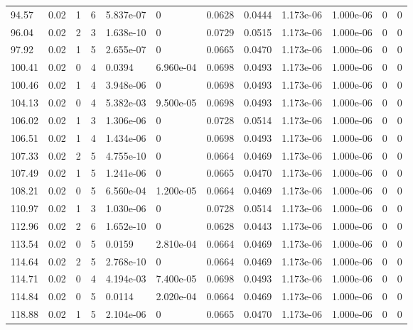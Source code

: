 \documentclass[preview]{standalone}
\begin{document}
{{{\begin{tabular}{L{1.2cm}C{1.2cm} C{0.3cm}C{0.5cm} C{1.4cm}C{1.4cm} C{1.4cm}C{1.4cm} C{1.6cm}C{1.6cm} C{1.6cm}C{1.6cm}}
  94.57  &  0.02  & 1     &  6 &  5.837e-07  & 0  &  0.0628&   0.0444& 1.173e-06 & 1.000e-06   &  0 & 0  \\ 
  96.04  &  0.02  & 2     &  3 &  1.638e-10  & 0  &  0.0729&   0.0515& 1.173e-06 & 1.000e-06   &  0 & 0  \\ 
  97.92  &  0.02  & 1     &  5 &  2.655e-07  & 0  &  0.0665&   0.0470& 1.173e-06 & 1.000e-06   &  0 & 0  \\ 
  100.41  &  0.02  & 0     &  4 &  0.0394  & 6.960e-04  &  0.0698&   0.0493& 1.173e-06 & 1.000e-06   &  0 & 0  \\ 
  100.46  &  0.02  & 1     &  4 &  3.948e-06  & 0  &  0.0698&   0.0493& 1.173e-06 & 1.000e-06   &  0 & 0  \\ 
  104.13  &  0.02  & 0     &  4 &  5.382e-03  & 9.500e-05  &  0.0698&   0.0493& 1.173e-06 & 1.000e-06   &  0 & 0  \\ 
  106.02  &  0.02  & 1     &  3 &  1.306e-06  & 0  &  0.0728&   0.0514& 1.173e-06 & 1.000e-06   &  0 & 0  \\ 
  106.51  &  0.02  & 1     &  4 &  1.434e-06  & 0  &  0.0698&   0.0493& 1.173e-06 & 1.000e-06   &  0 & 0  \\ 
  107.33  &  0.02  & 2     &  5 &  4.755e-10  & 0  &  0.0664&   0.0469& 1.173e-06 & 1.000e-06   &  0 & 0  \\ 
  107.49  &  0.02  & 1     &  5 &  1.241e-06  & 0  &  0.0665&   0.0470& 1.173e-06 & 1.000e-06   &  0 & 0  \\ 
  108.21  &  0.02  & 0     &  5 &  6.560e-04  & 1.200e-05  &  0.0664&   0.0469& 1.173e-06 & 1.000e-06   &  0 & 0  \\ 
  110.97  &  0.02  & 1     &  3 &  1.030e-06  & 0  &  0.0728&   0.0514& 1.173e-06 & 1.000e-06   &  0 & 0  \\ 
  112.96  &  0.02  & 2     &  6 &  1.652e-10  & 0  &  0.0628&   0.0443& 1.173e-06 & 1.000e-06   &  0 & 0  \\ 
  113.54  &  0.02  & 0     &  5 &  0.0159  & 2.810e-04  &  0.0664&   0.0469& 1.173e-06 & 1.000e-06   &  0 & 0  \\ 
  114.64  &  0.02  & 2     &  5 &  2.768e-10  & 0  &  0.0664&   0.0469& 1.173e-06 & 1.000e-06   &  0 & 0  \\ 
  114.71  &  0.02  & 0     &  4 &  4.194e-03  & 7.400e-05  &  0.0698&   0.0493& 1.173e-06 & 1.000e-06   &  0 & 0  \\ 
  114.84  &  0.02  & 0     &  5 &  0.0114  & 2.020e-04  &  0.0664&   0.0469& 1.173e-06 & 1.000e-06   &  0 & 0  \\ 
  118.88  &  0.02  & 1     &  5 &  2.104e-06  & 0  &  0.0665&   0.0470& 1.173e-06 & 1.000e-06   &  0 & 0  \\ 

\end{tabular}}}}
\end{document}
